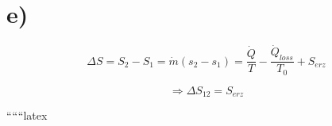

\section*{e)}

\[
\Delta S = S_2 - S_1 = \dot{m} (s_2 - s_1) = \frac{\dot{Q}}{T} - \frac{\dot{Q}_{loss}}{T_0} + S_{erz}
\]

\[
\Rightarrow \Delta S_{12} = S_{erz}
\]

``````latex